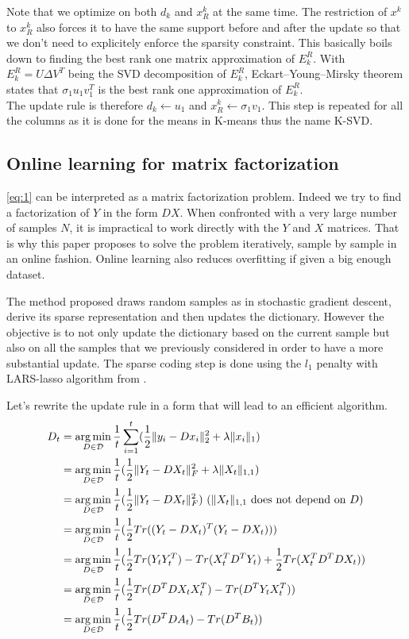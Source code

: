 \documentclass[a4paper,11pt]{article}
\DeclarePairedDelimiter\norm{\lVert}{\rVert} %
\DeclareMathOperator*{\argmin}{arg\,min} %
\begin{document}
Note that we optimize on both $d_k$ and $x^k_R$ at the same time. The restriction of $x^k$ to $x^k_R$ also forces it to have the same support before and after the update so that we don't need to explicitely enforce the sparsity constraint.
This basically boils down to finding the best rank one matrix approximation of $E_k^R$.
With $E_k^R = U \Delta V^T$ being the SVD decomposition of $E_k^R$, Eckart–Young–Mirsky theorem states that $\sigma_1 u_1 v_1^T$ is the best rank one approximation of $E_k^R$.\\
The update rule is therefore $d_k \leftarrow u_1$ and $x^k_R \leftarrow \sigma_1 v_1$.
This step is repeated for all the columns as it is done for the means in K-means thus the name K-SVD.


\subsection{Online learning for matrix factorization}
\cite{mairal10}
\ref{eq:1} can be interpreted as a matrix factorization problem. Indeed we try to find a factorization of $Y$ in the form $DX$.
When confronted with a very large number of samples $N$, it is impractical to work directly with the $Y$ and $X$ matrices. That is why this paper proposes to solve the problem iteratively, sample by sample in an online fashion. Online learning also reduces overfitting if given a big enough dataset.

The method proposed draws random samples as in stochastic gradient descent, derive its sparse representation and then updates the dictionary.
However the objective is to not only update the dictionary based on the current sample but also on all the samples that we previously considered in order to have a more substantial update.
The sparse coding step is done using the $l_1$ penalty with LARS-lasso algorithm from \cite{efron04}.

Let's rewrite the update rule in a form that will lead to an efficient algorithm.
\begin{equation*}
\begin{split}
  D_t & = \argmin_{D \in \mathcal{D}} \frac{1}{t} \sum\limits_{i=1}^t (\frac{1}{2} \norm{y_i - D x_i}_2^2 + \lambda \norm{x_i}_1)\\
      & = \argmin_{D \in \mathcal{D}} \frac{1}{t}  (\frac{1}{2} \norm{Y_t - DX_t}_F^2 + \lambda \norm{X_t}_{1,1})\\
      & = \argmin_{D \in \mathcal{D}} \frac{1}{t}  (\frac{1}{2} \norm{Y_t - DX_t}_F^2) \text{   ($\norm{X_t}_{1,1}$ does not depend on $D$)}\\
      & = \argmin_{D \in \mathcal{D}} \frac{1}{t}  (\frac{1}{2} Tr((Y_t - DX_t)^T (Y_t - DX_t)))\\
      & = \argmin_{D \in \mathcal{D}} \frac{1}{t}  (\frac{1}{2} Tr(Y_t Y_t^T) - Tr(X_t^T D^T Y_t) + \frac{1}{2} Tr(X_t^T D^T D X_t))\\
      & = \argmin_{D \in \mathcal{D}} \frac{1}{t}  (\frac{1}{2} Tr(D^T D X_t X_t^T) - Tr(D^T Y_t X_t^T) )\\
      & = \argmin_{D \in \mathcal{D}} \frac{1}{t}  (\frac{1}{2} Tr(D^T D A_t) - Tr(D^T B_t) )
\end{split}
\end{equation*}
\end{document}
